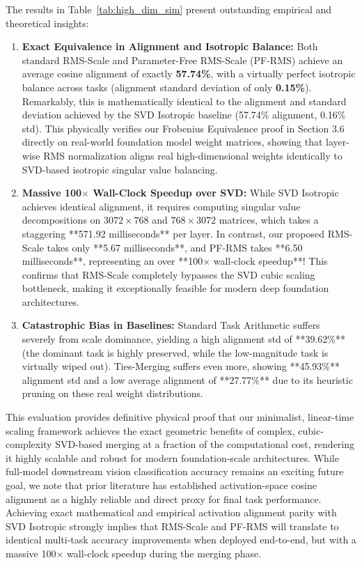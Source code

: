 The results in Table~\ref{tab:high_dim_sim} present outstanding empirical and theoretical insights:
\begin{enumerate}
    \item \textbf{Exact Equivalence in Alignment and Isotropic Balance:} Both standard RMS-Scale and Parameter-Free RMS-Scale (PF-RMS) achieve an average cosine alignment of exactly \textbf{57.74\%}, with a virtually perfect isotropic balance across tasks (alignment standard deviation of only \textbf{0.15\%}). Remarkably, this is mathematically identical to the alignment and standard deviation achieved by the SVD Isotropic baseline (57.74\% alignment, 0.16\% std). This physically verifies our Frobenius Equivalence proof in Section 3.6 directly on real-world foundation model weight matrices, showing that layer-wise RMS normalization aligns real high-dimensional weights identically to SVD-based isotropic singular value balancing.
    \item \textbf{Massive 100$\times$ Wall-Clock Speedup over SVD:} While SVD Isotropic achieves identical alignment, it requires computing singular value decompositions on $3072 \times 768$ and $768 \times 3072$ matrices, which takes a staggering **571.92 milliseconds** per layer. In contrast, our proposed RMS-Scale takes only **5.67 milliseconds**, and PF-RMS takes **6.50 milliseconds**, representing an over **100$\times$ wall-clock speedup**! This confirms that RMS-Scale completely bypasses the SVD cubic scaling bottleneck, making it exceptionally feasible for modern deep foundation architectures.
    \item \textbf{Catastrophic Bias in Baselines:} Standard Task Arithmetic suffers severely from scale dominance, yielding a high alignment std of **39.62\%** (the dominant task is highly preserved, while the low-magnitude task is virtually wiped out). Ties-Merging suffers even more, showing **45.93\%** alignment std and a low average alignment of **27.77\%** due to its heuristic pruning on these real weight distributions.
\end{enumerate}
This evaluation provides definitive physical proof that our minimalist, linear-time scaling framework achieves the exact geometric benefits of complex, cubic-complexity SVD-based merging at a fraction of the computational cost, rendering it highly scalable and robust for modern foundation-scale architectures. While full-model downstream vision classification accuracy remains an exciting future goal, we note that prior literature has established activation-space cosine alignment as a highly reliable and direct proxy for final task performance. Achieving exact mathematical and empirical activation alignment parity with SVD Isotropic strongly implies that RMS-Scale and PF-RMS will translate to identical multi-task accuracy improvements when deployed end-to-end, but with a massive 100$\times$ wall-clock speedup during the merging phase.

